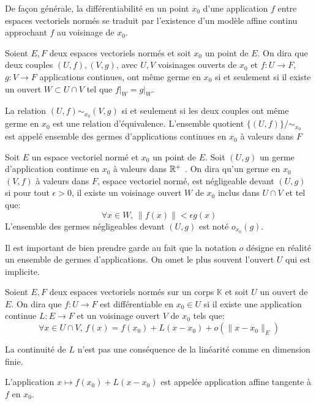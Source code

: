 De façon générale, la différentiabilité en un point $x_0$ d'une application $f$ entre espaces vectoriels normés se traduit par l'existence d'un modèle affine continu approchant $f$ au voisinage de $x_0$.
\begin{defn}
Soient $E,F$ deux espaces vectoriels normés et soit $x_0$ un point de $E$. On dira que deux couples $(U,f),(V,g)$, avec $U,V$ voisinages ouverts de $x_0$ et $f\colon U \to F$,$g \colon V \to F$ applications continues, ont même germe en $x_0$ si et seulement si il existe un ouvert $W \subset U \cap V$ tel que $f\rvert_{W}=g\rvert_{W}$.
\end{defn}
\begin{prop}
La relation $(U,f) \sim_{x_0} (V,g)$ si et seulement si les deux couples ont même germe en $x_0$ est une relation d'équivalence. L'ensemble quotient $\{(U,f)\} / \sim_{x_0}$ est appelé ensemble des germes d'applications continues en $x_0$ à valeurs dans $F$ 
\end{prop}
\begin{defn}
Soit $E$ un espace vectoriel normé et $x_0$ un point de $E$. Soit $(U,g)$ un germe d'application continue en $x_0$ à valeurs dans $\mathbb R^+$ . On dira qu'un germe en $x_0$ $(V,f)$ à valeurs dans $F$, espace vectoriel normé,  est négligeable devant $(U,g)$ si pour tout $\epsilon > 0$, il existe un voisinage ouvert $W$ de $x_0$ inclus dans $U\cap V$ et tel que:
\[
\forall x \in W, \, \|f(x)\| < \epsilon g(x)
\]
L'ensemble des germes négligeables devant $(U,g)$ est noté $o_{x_0}(g)$.
\end{defn}
\begin{rem}
Il est important de bien prendre garde au fait que la notation $o$ désigne en réalité un ensemble de germes d'applications. On omet le plus souvent l'ouvert $U$ qui est implicite. \end{rem}
\begin{fdefn}
Soient $E,F$ deux espaces vectoriels normés sur un corps $\mathbb{K}$
 et soit $U$ un ouvert de $E$. On dira que $f \colon U \to F$ est différentiable en $x_0 \in U$ si il existe une application continue $L \colon E \to F$ et un voisinage ouvert $V$ de $x_0$ tels que:
 \[
 \forall x \in U \cap V, \, f(x) = f(x_0) + L(x-x_0) + o(\|x-x_0\|_E)
 \]
\end{fdefn}
\begin{rem}
La continuité de $L$ n'est pas une conséquence de la linéarité comme en dimension finie. 
\end{rem}
L'application $ x \mapsto f(x_0) + L(x-x_0)$ est appelée application affine tangente à $f$ en $x_0$.
